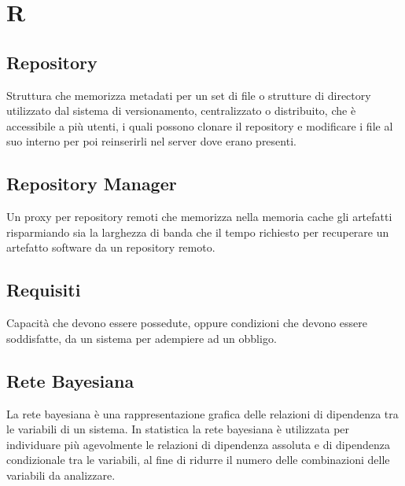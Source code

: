 \section*{R}

\subsection{Repository}
Struttura che memorizza metadati per un set di file o strutture di directory utilizzato dal sistema di versionamento, centralizzato o distribuito, che è accessibile a più utenti, i quali possono clonare il repository e modificare i file al suo interno per poi reinserirli nel server dove erano presenti.

\subsection{Repository Manager}
Un proxy per repository remoti che memorizza nella memoria cache gli artefatti risparmiando sia la larghezza di banda che il tempo richiesto per recuperare un artefatto software da un repository remoto.

\subsection{Requisiti}
Capacità che devono essere possedute, oppure condizioni che devono essere soddisfatte, da un sistema per adempiere ad un obbligo.

\subsection{Rete Bayesiana}
La rete bayesiana è una rappresentazione grafica delle relazioni di dipendenza tra le variabili di un sistema. In statistica la rete bayesiana è utilizzata per individuare più agevolmente le relazioni di dipendenza assoluta e di dipendenza condizionale tra le variabili, al fine di ridurre il numero delle combinazioni delle variabili da analizzare.
